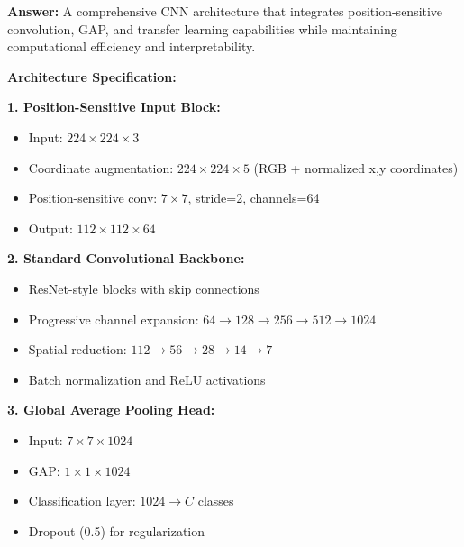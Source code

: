 \documentclass[12pt]{article}
\newcommand{\answer}[1]{{\color{answercolor}\textbf{Answer:} #1}}
\newcommand{\explanation}[1]{{\color{explanationcolor}#1}}
\begin{document}
\begin{enumerate}[(a)]
\begin{center}
    \end{center}
    
    \answer{A comprehensive CNN architecture that integrates position-sensitive convolution, GAP, and transfer learning capabilities while maintaining computational efficiency and interpretability.}
    
    \explanation{
    \textbf{Architecture Specification:}
    
    \textbf{1. Position-Sensitive Input Block:}
    \begin{itemize}
        \item Input: $224 \times 224 \times 3$
        \item Coordinate augmentation: $224 \times 224 \times 5$ (RGB + normalized x,y coordinates)
        \item Position-sensitive conv: $7 \times 7$, stride=2, channels=64
        \item Output: $112 \times 112 \times 64$
    \end{itemize}
    
    \textbf{2. Standard Convolutional Backbone:}
    \begin{itemize}
        \item ResNet-style blocks with skip connections
        \item Progressive channel expansion: $64 \rightarrow 128 \rightarrow 256 \rightarrow 512 \rightarrow 1024$
        \item Spatial reduction: $112 \rightarrow 56 \rightarrow 28 \rightarrow 14 \rightarrow 7$
        \item Batch normalization and ReLU activations
    \end{itemize}
    
    \textbf{3. Global Average Pooling Head:}
    \begin{itemize}
        \item Input: $7 \times 7 \times 1024$
        \item GAP: $1 \times 1 \times 1024$
        \item Classification layer: $1024 \rightarrow C$ classes
        \item Dropout (0.5) for regularization
    \end{itemize}
    
}
\end{enumerate}
\end{document}
